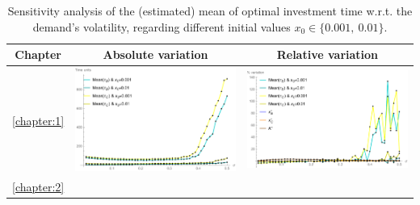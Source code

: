 \begin{table}[!htb]
	\caption{Sensitivity analysis of the (estimated) mean of optimal investment time w.r.t. the demand's volatility, regarding different initial values $x_0 \in \{0.001, \ 0.01\}$.}
	\begin{tabular}{c|c|c}
		\hline
		Chapter & Absolute variation & Relative variation \\ \hline
		\ref{chapter:1} & \begin{minipage}{.45\textwidth}
			\includegraphics[width=\linewidth]{StopTime/1_meantauSP500H1500.pdf}
		\end{minipage}
	 & \begin{minipage}{.45\textwidth}
	 	\includegraphics[width=\linewidth]{StopTime/1_var1.pdf}
	 \end{minipage}
  \\ \hline
		\ref{chapter:2} & 
		\begin{minipage}{.45\textwidth}

\end{minipage}
\end{tabular}
\end{table}
